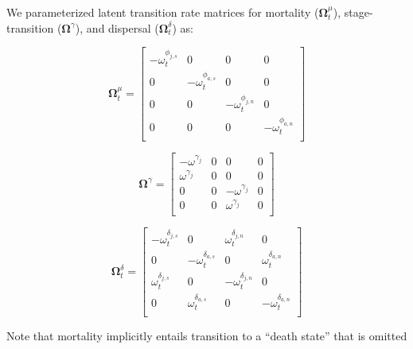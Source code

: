 \documentclass[11pt]{article}
\begin{document}
We parameterized latent transition rate matrices for mortality ($\mathbf{\Omega}^{\mu}_t$), 
stage-transition ($\mathbf{\Omega}^{\gamma}$), 
and dispersal ($\mathbf{\Omega}^{\delta}_t$) as:
%
\begin{linenomath*}
\begin{equation} \label{eq:Mu}
\mathbf{\Omega}^{\mu}_t  = 
\left[
\begin{array}{cc|cc}
    -\omega^{\phi_{j,s}}_t & 0 & 0 & 0 \\
    0 & -\omega^{\phi_{a,s}}_t & 0 & 0 \\
    \hline
    0 & 0 & -\omega^{\phi_{j,n}}_t & 0 \\
    0 & 0 & 0 & -\omega^{\phi_{a,n}}_t \\
    \end{array}
\right] 
\end{equation}
\end{linenomath*}
%
\begin{linenomath*}
\begin{equation} \label{eq:Gamma}
\mathbf{\Omega}^{\gamma}  = 
\left[
\begin{array}{cc|cc}
    -\omega^{\gamma_{j}} & 0 & 0 & 0 \\
    \omega^{\gamma_{j}}  & 0 & 0 & 0 \\
    \hline
    0 & 0 & -\omega^{\gamma_{j}} & 0 \\
    0 & 0 & \omega^{\gamma_{j}}  & 0 \\
    \end{array}
\right] 
\end{equation}
\end{linenomath*}
%
\begin{linenomath*}
\begin{equation} \label{eq:Delta}
\mathbf{\Omega}^{\delta}_t  = 
\left[
\begin{array}{cc|cc}
    -\omega^{\delta_{j,s}}_t & 0 & \omega^{\delta_{j,n}}_t & 0 \\
    0 & -\omega^{\delta_{a,s}}_t & 0 & \omega^{\delta_{a,n}}_t \\
    \hline
    \omega^{\delta_{j,s}}_t & 0 & -\omega^{\delta_{j,n}}_t & 0 \\
    0 & \omega^{\delta_{a,s}}_t & 0 & -\omega^{\delta_{a,n}}_t \\
    \end{array}
\right]
\end{equation}
\end{linenomath*}
%
Note that mortality implicitly entails transition to a ``death state'' that is omitted 
\end{document}
